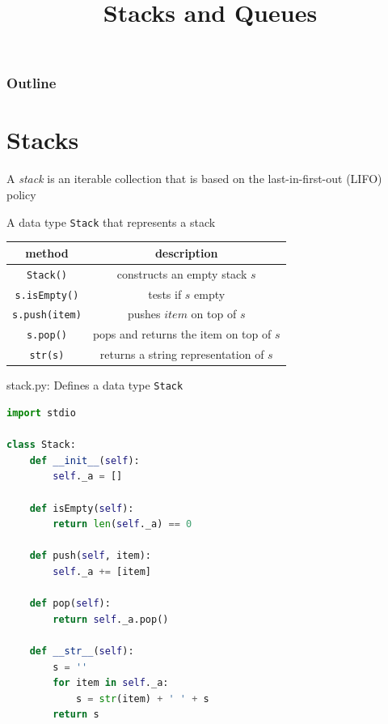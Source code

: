 \documentclass[8pt,a4paper,compress,handout]{beamer}
\title{Stacks and Queues}
\date{}
\begin{document}
\begin{frame}
\vfill
\titlepage
\end{frame}

\begin{frame}
\frametitle{Outline}
\tableofcontents
\end{frame}

\section{Stacks}
\begin{frame}[fragile]
A \emph{stack} is an iterable collection that is based on the last-in-first-out (LIFO) policy

\bigskip

A data type \lstinline{Stack} that represents a stack
\begin{center}
\begin{tabular}{cc}
method & description \\ \hline
\lstinline$Stack()$ & constructs an empty stack $s$ \\
\lstinline$s.isEmpty()$ & tests if $s$ empty \\
\lstinline$s.push(item)$ & pushes $item$ on top of $s$ \\
\lstinline$s.pop()$ &  pops and returns the item on top of $s$ \\
\lstinline$str(s)$ & returns a string representation of $s$
\end{tabular} 
\end{center}
\end{frame}

\begin{frame}[fragile]
\begin{framed}
\tiny stack.py: Defines a data type \lstinline{Stack}
\end{framed}

\begin{lstlisting}[language=Python]
import stdio

class Stack:
    def __init__(self):
        self._a = []

    def isEmpty(self):
        return len(self._a) == 0

    def push(self, item):
        self._a += [item]

    def pop(self):
        return self._a.pop()

    def __str__(self):
        s = ''
        for item in self._a:
            s = str(item) + ' ' + s
        return s
\end{lstlisting}
\end{frame}
\end{document}
